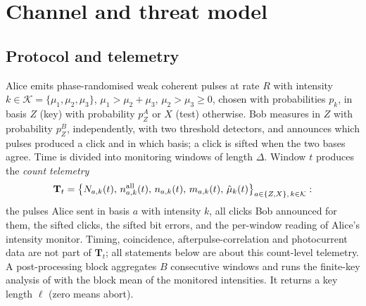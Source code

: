 \section{Channel and threat model}\label{sec:model}

\subsection{Protocol and telemetry}
Alice emits phase-randomised weak coherent pulses at rate $R$ with intensity $k\in\mathcal{K}=\{\mu_1,\mu_2,\mu_3\}$, $\mu_1>\mu_2+\mu_3$, $\mu_2>\mu_3\geq0$, chosen with probabilities $p_k$, in basis $Z$ (key) with probability $p_Z^A$ or $X$ (test) otherwise. Bob measures in $Z$ with probability $p_Z^B$, independently, with two threshold detectors, and announces which pulses produced a click and in which basis; a click is sifted when the two bases agree. Time is divided into monitoring windows of length $\Delta$. Window $t$ produces the \emph{count telemetry}
\begin{equation}\label{eq:telemetry}
\mathbf{T}_t=\bigl\{N_{a,k}(t),\,n^{\rm all}_{a,k}(t),\,n_{a,k}(t),\,m_{a,k}(t),\,\hat\mu_k(t)\bigr\}_{a\in\{Z,X\},\,k\in\mathcal{K}}:
\end{equation}
the pulses Alice sent in basis $a$ with intensity $k$, all clicks Bob announced for them, the sifted clicks, the sifted bit errors, and the per-window reading of Alice's intensity monitor. Timing, coincidence, afterpulse-correlation and photocurrent data are not part of $\mathbf{T}_t$; all statements below are about this count-level telemetry. A post-processing block aggregates $B$ consecutive windows and runs the finite-key analysis of \cite{lim2014} with the block mean of the monitored intensities. It returns a key length $\ell$ (zero means abort).

